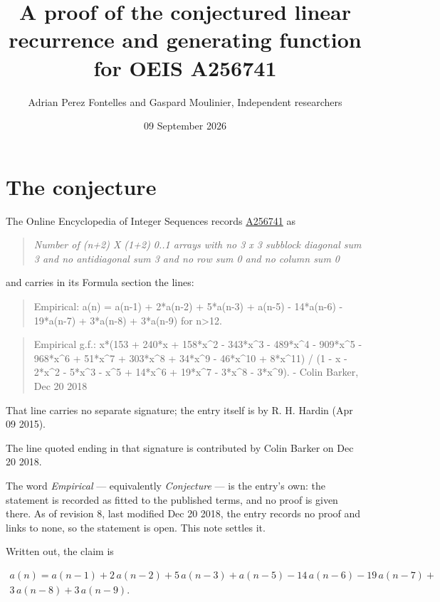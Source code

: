 \documentclass[11pt]{article}
\title{A proof of the conjectured linear recurrence and generating function for OEIS A256741}
\author{Adrian Perez Fontelles and Gaspard Moulinier, Independent researchers}
\date{09 September 2026}
\theoremstyle{definition}
\begin{document}
\maketitle
\section{The conjecture}

The Online Encyclopedia of Integer Sequences records \href{https://oeis.org/A256741}{A256741} as

\begin{quote}\itshape Number of (n+2) X (1+2) 0..1 arrays with no 3 x 3 subblock diagonal sum 3 and no antidiagonal sum 3 and no row sum 0 and no column sum 0\end{quote}

and carries in its Formula section the lines:

\begin{quote}\ttfamily Empirical: a(n) = a(n-1) + 2*a(n-2) + 5*a(n-3) + a(n-5) - 14*a(n-6) - 19*a(n-7) + 3*a(n-8) + 3*a(n-9) for n>12.\end{quote}

\begin{quote}\ttfamily Empirical g.f.: x*(153 + 240*x + 158*x\textasciicircum{}2 - 343*x\textasciicircum{}3 - 489*x\textasciicircum{}4 - 909*x\textasciicircum{}5 - 968*x\textasciicircum{}6 + 51*x\textasciicircum{}7 + 303*x\textasciicircum{}8 + 34*x\textasciicircum{}9 - 46*x\textasciicircum{}10 + 8*x\textasciicircum{}11) / (1 - x - 2*x\textasciicircum{}2 - 5*x\textasciicircum{}3 - x\textasciicircum{}5 + 14*x\textasciicircum{}6 + 19*x\textasciicircum{}7 - 3*x\textasciicircum{}8 - 3*x\textasciicircum{}9). - Colin Barker, Dec 20 2018\end{quote}

That line carries no separate signature; the entry itself is by R. H. Hardin (Apr 09 2015).

The line quoted ending in that signature is contributed by Colin Barker on Dec 20 2018.

The word {\itshape Empirical} --- equivalently {\itshape Conjecture} --- is the entry's own: the statement is recorded as fitted to the published terms, and no proof is given there. As of revision 8, last modified Dec 20 2018, the entry records no proof and links to none, so the statement is open. This note settles it.

Written out, the claim is

\begin{multline*} a(n) = a(n-1) + 2\,a(n-2) + 5\,a(n-3) + a(n-5) - 14\,a(n-6) - 19\,a(n-7) + \\ 3\,a(n-8) + 3\,a(n-9). \end{multline*}
\end{document}

